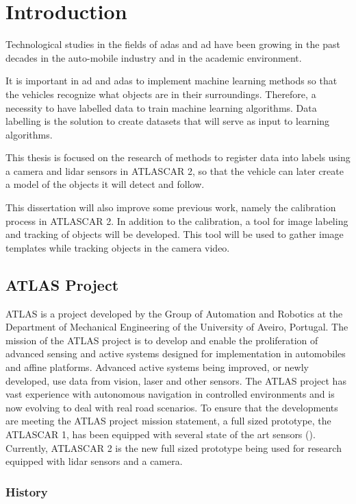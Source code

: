 \chapter{Introduction}
Technological studies in the fields of \gls{adas} and \gls{ad} have been growing in the past decades in the auto-mobile industry and in the academic environment. 

It is important in \gls{ad} and \gls{adas} to implement machine learning methods so that the vehicles recognize what objects are in their surroundings. Therefore, a necessity to have labelled data to train machine learning algorithms. Data labelling is the solution to create datasets that will serve as input to learning algorithms.

This thesis is focused on the research of methods to register data into labels using a camera and \gls{lidar} sensors in ATLASCAR 2, so that the vehicle can later create a model of the objects it will detect and follow.

This dissertation will also improve some previous work, namely the calibration process in ATLASCAR 2. In addition to the calibration, a tool for image labeling and tracking of objects will be developed. This tool will be used to gather image templates while tracking objects in the camera video. 

\section{ATLAS Project}

ATLAS is a project developed by the Group of Automation and Robotics at the Department of Mechanical Engineering of the University of Aveiro, Portugal. The mission of the ATLAS project is to develop and enable the proliferation of advanced sensing and active systems designed for implementation in automobiles and affine platforms. Advanced active systems being improved, or newly developed, use data from vision, laser and other sensors. The ATLAS project has vast experience with autonomous navigation in controlled environments and is now evolving to deal with real road scenarios. To ensure that the developments are meeting the ATLAS project mission statement, a full sized prototype, the ATLASCAR 1, has been equipped with several state of the art sensors (\cite{LARlabs}). Currently, ATLASCAR 2 is the new full sized prototype being used for research equipped with \gls{lidar} sensors and a camera.

\subsection{History}

